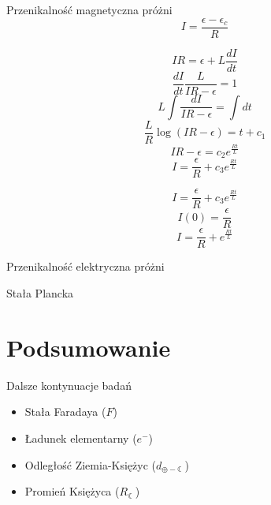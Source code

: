 \documentclass{beamer}
\begin{document}
\begin{frame}{Przenikalność magnetyczna próżni}
	$$I = \frac{\epsilon-\epsilon_c}{R}$$

	$$I R = \epsilon + L\frac{dI}{dt}$$
	$$\frac{dI}{dt}\frac{L}{IR-\epsilon}=1$$
	$$L\int\frac{dI}{IR-\epsilon} = \int dt$$
	$$\frac{L}{R}\log(IR-\epsilon) = t+c_1$$
	$$IR - \epsilon = c_2 e^{\frac{Rt}{L}}$$
	$$I = \frac{\epsilon}{R} + c_3 e^{\frac{Rt}{L}}$$

\end{frame}

\begin{frame}
	$$I = \frac{\epsilon}{R} + c_3 e^{\frac{Rt}{L}}$$
	$$I(0)= \frac{\epsilon}{R}$$
	$$I = \frac{\epsilon}{R} + e^{\frac{Rt}{L}}$$
\end{frame}

\begin{frame}{Przenikalność elektryczna próżni}

\end{frame}

\begin{frame}{Stała Plancka}

\end{frame}


\section{Podsumowanie}

\begin{frame}{Dalsze kontynuacje badań}
	\begin{itemize}
		\item Stała Faradaya ($F$)
		\item Ładunek elementarny ($e^-$)
		\item Odległość Ziemia-Księżyc ($d_{\oplus - \leftmoon}$)
		\item Promień Księżyca ($R_{\leftmoon}$)
	\end{itemize}

\end{frame}
\end{document}
